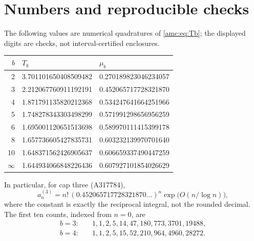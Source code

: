 \documentclass[11pt,letterpaper]{article}
\theoremstyle{remark}\newtheorem{remark}[theorem]{Remark}
\begin{document}
\section{Numbers and reproducible checks}\label{amc:sec:checks}
The following values are numerical quadratures of \eqref{amc:eq:Tb}; the displayed digits are checks, not interval-certified enclosures.
\begin{center}
\begin{tabular}{rll}
\toprule
$b$ & $T_b$ & $\mu_b$\\
\midrule
2 & 3.701101650408509482 & 0.270189823046234057\\
3 & 2.212067760911192191 & 0.452065717728321870\\
4 & 1.871791135820212368 & 0.534247641664251966\\
5 & 1.748278343303498299 & 0.571991298656956259\\
6 & 1.695001120651513698 & 0.589970111415399178\\
8 & 1.657736605427835731 & 0.603232139970701640\\
10 & 1.648371562426905637 & 0.606659337490447259\\
$\infty$ & 1.644934066848226436 & 0.607927101854026629\\
\bottomrule
\end{tabular}
\end{center}
In particular, for cap three (A317784),
\[
 a_n^{(3)}=n!\,(0.452065717728321870\ldots)^n
                \exp\bigl(O(n/\log n)\bigr),
\]
where the constant is exactly the reciprocal integral, not the rounded decimal. The first ten counts, indexed from $n=0$, are
\begin{align*}
 b=3:&\quad 1,1,2,5,14,47,180,773,3701,19488,\\
 b=4:&\quad 1,1,2,5,15,52,210,964,4960,28272.
\end{align*}
\end{document}
